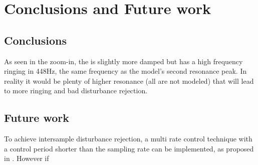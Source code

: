 \chapter{Conclusions and Future work}\label{cha:conclusion}

\section{Conclusions}

As seen in the zoom-in, the \abbrIRC is slightly more damped but has a high frequency ringing in 448Hz, the same frequency as the model's second resonance peak. In reality it would be plenty of  higher resonance (all are not modeled) that will lead to more ringing and bad disturbance rejection.

\section{Future work}

To achieve intersample disturbance rejection, a multi rate control technique with a control period shorter than the sampling rate can be implemented, as proposed in \citep{fujimoto2009rro}. However if
